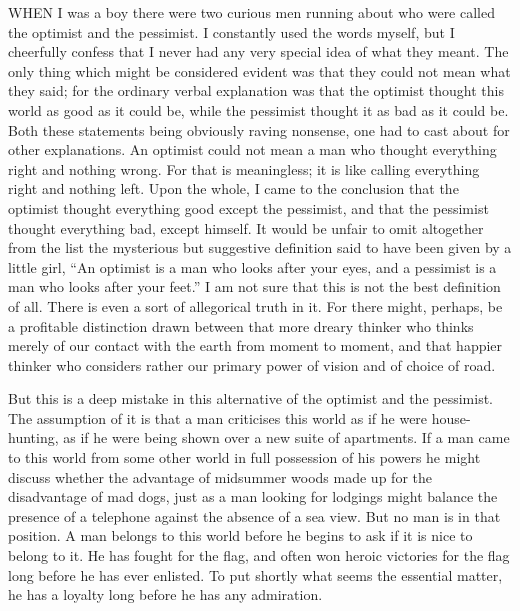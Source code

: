 WHEN I was a boy there were two curious men running about who were called the optimist and the pessimist. I constantly used the words myself, but I cheerfully confess that I never had any very special idea of what they meant. The only thing which might be considered evident was that they could not mean what they said; for the ordinary verbal explanation was that the optimist thought this world as good as it could be, while the pessimist thought it as bad as it could be. Both these statements being obviously raving nonsense, one had to cast about for other explanations. An optimist could not mean a man who thought everything right and nothing wrong. For that is meaningless; it is like calling everything right and nothing left. Upon the whole, I came to the conclusion that the optimist thought everything good except the pessimist, and that the pessimist thought everything bad, except himself. It would be unfair to omit altogether from the list the mysterious but suggestive definition said to have been given by a little girl, “An optimist is a man who looks after your eyes, and a pessimist is a man who looks after your feet.” I am not sure that this is not the best definition of all. There is even a sort of allegorical truth in it. For there might, perhaps, be a profitable distinction drawn between that more dreary thinker who thinks merely of our contact with the earth from moment to moment, and that happier thinker who considers rather our primary power of vision and of choice of road.

But this is a deep mistake in this alternative of the optimist and the pessimist. The assumption of it is that a man criticises this world as if he were house-hunting, as if he were being shown over a new suite of apartments. If a man came to this world from some other world in full possession of his powers he might discuss whether the advantage of midsummer woods made up for the disadvantage of mad dogs, just as a man looking for lodgings might balance the presence of a telephone against the absence of a sea view. But no man is in that position. A man belongs to this world before he begins to ask if it is nice to belong to it. He has fought for the flag, and often won heroic victories for the flag long before he has ever enlisted. To put shortly what seems the essential matter, he has a loyalty long before he has any admiration.

